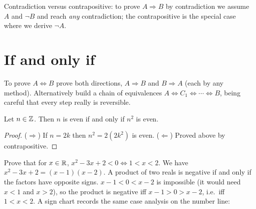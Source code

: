 \begin{aside}
Contradiction versus contrapositive: to prove $A \Rightarrow B$ by contradiction we assume $A$
and $\neg B$ and reach \emph{any} contradiction; the contrapositive is the special case where
we derive $\neg A$.
\end{aside}

\section{If and only if}

To prove $A \Leftrightarrow B$ prove both directions, $A \Rightarrow B$ and $B \Rightarrow A$
(each by any method). Alternatively build a chain of equivalences
$A \iff C_1 \iff \cdots \iff B$, being careful that every step really is reversible.

\begin{proposition}
Let $n \in \mathbb{Z}$. Then $n$ is even if and only if $n^2$ is even.
\end{proposition}
\begin{proof}
($\Rightarrow$) If $n = 2k$ then $n^2 = 2(2k^2)$ is even.
($\Leftarrow$) Proved above by contrapositive.
\end{proof}

\begin{example}
Prove that for $x\in\mathbb{R}$, $x^2 - 3x + 2 < 0 \iff 1 < x < 2$.
We have $x^2 - 3x + 2 = (x-1)(x-2)$. A product of two reals is negative if and only if the
factors have opposite signs. $x - 1 < 0 < x - 2$ is impossible (it would need $x < 1$ and
$x > 2$), so the product is negative iff $x - 1 > 0 > x - 2$, i.e.\ iff $1 < x < 2$.
A sign chart records the same case analysis on the number line:
\begin{center}
\end{center}
\end{example}

